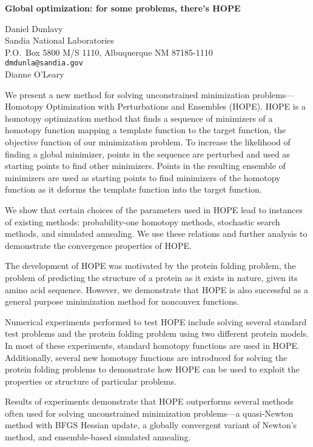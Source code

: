\documentclass{report}
\begin{document}

\begin{center}
{\large
{\bf Global optimization: for some problems, there's HOPE}}

	Daniel Dunlavy \\
	Sandia National Laboratories \\
	P.O.~Box 5800 M/S 1110, Albuquerque NM 87185-1110 \\
	{\tt dmdunla@sandia.gov} \\
	Dianne O'Leary
\end{center}
We present a new method for solving unconstrained
minimization problems---Homotopy Optimization with
Perturbations and Ensembles (HOPE). HOPE is a homotopy
optimization method that finds a sequence of minimizers of a
homotopy function mapping a template function to the target
function, the objective function of our minimization
problem. To increase the likelihood of finding a global
minimizer, points in the sequence are perturbed and used as
starting points to find other minimizers. Points in the
resulting ensemble of minimizers are used as starting points
to find minimizers of the homotopy function as it deforms
the template function into the target function.

We show
that certain choices of the parameters used in HOPE lead to
instances of existing methods: probability-one homotopy
methods, stochastic search methods, and simulated annealing.
We use these relations and further analysis to demonstrate
the convergence properties of HOPE.

The development of
HOPE was motivated by the protein folding problem, the
problem of predicting the structure of a protein as it
exists in nature, given its amino acid sequence. However, we
demonstrate that HOPE is also successful as a general
purpose minimization method for nonconvex functions.


Numerical experiments performed to test HOPE include solving
several standard test problems and the protein folding
problem using two different protein models. In most of these
experiments, standard homotopy functions are used in HOPE.
Additionally, several new homotopy functions are introduced
for solving the protein folding problems to demonstrate how
HOPE can be used to exploit the properties or structure of
particular problems.

Results of experiments demonstrate
that HOPE outperforms several methods often used for solving
unconstrained minimization problems---a quasi-Newton method
with BFGS Hessian update, a globally convergent variant of
Newton's method, and ensemble-based simulated annealing.



\end{document}
